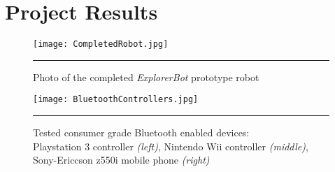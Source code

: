 \chapter{Project Results}
\label{Chapter 6}


\begin{figure}[tbph]
	\vspace{1em}
	\centering
		\texttt{[image: CompletedRobot.jpg]}
	\rule{35em}{0.5pt}
	\caption[Photo of Completed Robot]{Photo of the completed \textit{ExplorerBot} prototype robot}
	\label{fig:completedrobot}
\end{figure}

\begin{figure}[tbph]
	\vspace{1em}
	\centering
		\texttt{[image: BluetoothControllers.jpg]}
	\rule{35em}{0.5pt}
	\caption[Tested Working Controllers]{Tested consumer grade Bluetooth enabled devices: \\ Playstation 3 controller \textit{(left)}, Nintendo Wii controller \textit{(middle)}, Sony-Ericcson z550i mobile phone \textit{(right)} }
	\label{fig:workingbtcontrollers}
\end{figure}